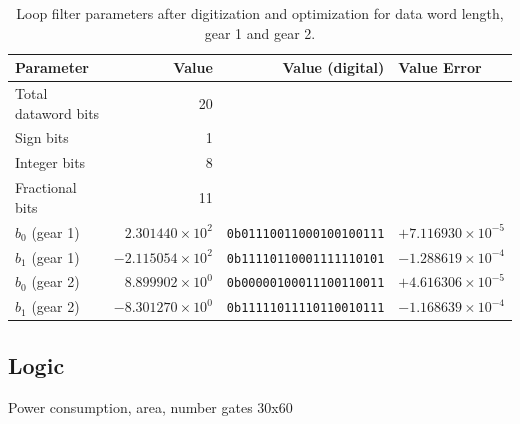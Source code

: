		\begin{table}[h!]
			\centering
			\def\arraystretch{1.5}		
			\setlength\arrayrulewidth{0.75pt}
			\setlength{\tabcolsep}{1em} %
			\begin{tabular}{|l|r|r|l|}
				\hline 
				\rule[-1ex]{0pt}{2.5ex} \cellcolor{gray!40}\textbf{Parameter} & \cellcolor{gray!40}\textbf{Value} & \cellcolor{gray!40}\textbf{Value (digital) } & \cellcolor{gray!40}\textbf{Value Error}\\ 
				\hline 
				\rule[-1ex]{0pt}{2.5ex} Total dataword bits  & 20 & & \\ 
				\hline 
				\rule[-1ex]{0pt}{2.5ex} Sign bits  & 1 & & \\ 
				\hline 
				\rule[-1ex]{0pt}{2.5ex} Integer bits & 8 & & \\ 
				\hline 
				\rule[-1ex]{0pt}{2.5ex} Fractional bits  & 11 & & \\ 
				\hline 
				\rule[-1ex]{0pt}{2.5ex} \textbf{$b_0$} {\color{red} (gear 1)} & $2.301440\times10^2$ & \texttt{0b01110011000100100111}  & $+7.116930\times10^{-5}$\\
				\hline 
				\rule[-1ex]{0pt}{2.5ex} \textbf{$b_1$} {\color{red} (gear 1)} & $-2.115054\times10^2$ & \texttt{0b11110110001111110101}  & $-1.288619\times10^{-4}$\\
				\hline 
				\rule[-1ex]{0pt}{2.5ex} \textbf{$b_0$} {\color{blue} (gear 2)} & $8.899902\times10^0$ & \texttt{0b00000100011100110011}  & $+4.616306\times10^{-5}$\\
				\hline 
				\rule[-1ex]{0pt}{2.5ex} \textbf{$b_1$} {\color{blue} (gear 2)} & $-8.301270\times10^0$ & \texttt{0b11111011110110010111}  & $-1.168639\times10^{-4}$\\
				\hline 
			\end{tabular} 
			\caption{Loop filter parameters after digitization and optimization for data word length, gear 1 and gear 2.}
			\label{dig_filter_params_fast}
		\end{table}  

\FloatBarrier\subsection{Logic}
Power consumption, area, number gates
30x60 


